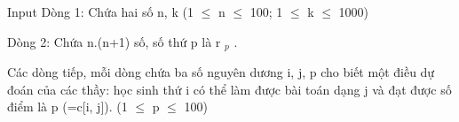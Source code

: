 Input
Dòng 1: Chứa hai số n, k (1  $\le$  n  $\le$  100; 1  $\le$  k  $\le$  1000)

Dòng 2: Chứa n.(n+1) số, số thứ p là r $_ p $ .

Các dòng tiếp, mỗi dòng chứa ba số nguyên dương i, j, p cho biết một điều dự đoán của các thầy: học sinh thứ i có thể làm được bài toán dạng j và đạt được số điểm là p (=c[i, j]). (1  $\le$  p  $\le$  100)